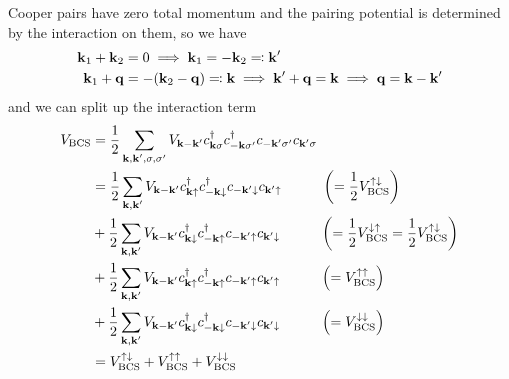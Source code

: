 \documentclass[../main.tex]{subfiles}
\begin{document}
Cooper pairs have zero total momentum and the pairing potential is determined by the interaction on them, so we have
\begin{align}
    \bm{\mathrm{k}}_1 + \bm{\mathrm{k}}_2 &= 0 \implies \bm{\mathrm{k}}_1 = - \bm{\mathrm{k}}_2 \eqcolon \bm{\mathrm{k}}^{\prime} \\
    \bm{\mathrm{k}}_1 + \bm{\mathrm{q}} &= -(\bm{\mathrm{k}}_2 - \bm{\mathrm{q}}) \eqcolon \bm{\mathrm{k}} \implies \bm{\mathrm{k}}^{\prime} + \bm{\mathrm{q}} = \bm{\mathrm{k}} \implies \bm{\mathrm{q}} = \bm{\mathrm{k}} - \bm{\mathrm{k}}^{\prime}
\end{align}
and we can split up the interaction term
\begin{align}
    V_{\text{BCS}} &= \frac{1}{2} \sum_{\bm{\mathrm{k}}, \bm{\mathrm{k}}^{\prime}, \sigma, \sigma^{\prime}} V_{\bm{\mathrm{k}}-\bm{\mathrm{k}}^{\prime}} c_{\bm{\mathrm{k}} \sigma}^{\dagger} c_{-\bm{\mathrm{k}} \sigma^{\prime}}^{\dagger} c_{-\bm{\mathrm{k}}^{\prime} \sigma^{\prime}} c_{\bm{\mathrm{k}}^{\prime} \sigma} \\
    &= \frac{1}{2} \sum_{\bm{\mathrm{k}}, \bm{\mathrm{k}}^{\prime}} V_{\bm{\mathrm{k}}-\bm{\mathrm{k}}^{\prime}} c_{\bm{\mathrm{k}} \uparrow}^{\dagger} c_{-\bm{\mathrm{k}} \downarrow}^{\dagger} c_{-\bm{\mathrm{k}}^{\prime} \downarrow} c_{\bm{\mathrm{k}}^{\prime} \uparrow} \hspace{1cm} \left(= \frac{1}{2} V_{\text{BCS}}^{\uparrow \downarrow}  \right)\\
    &+ \frac{1}{2} \sum_{\bm{\mathrm{k}}, \bm{\mathrm{k}}^{\prime}} V_{\bm{\mathrm{k}}-\bm{\mathrm{k}}^{\prime}} c_{\bm{\mathrm{k}} \downarrow}^{\dagger} c_{-\bm{\mathrm{k}} \uparrow}^{\dagger} c_{-\bm{\mathrm{k}}^{\prime} \uparrow} c_{\bm{\mathrm{k}}^{\prime} \downarrow} \hspace{1cm} \left(= \frac{1}{2} V_{\text{BCS}}^{\downarrow \uparrow} = \frac{1}{2} V_{\text{BCS}}^{\uparrow \downarrow} \right)\\
    &+ \frac{1}{2} \sum_{\bm{\mathrm{k}}, \bm{\mathrm{k}}^{\prime}} V_{\bm{\mathrm{k}}-\bm{\mathrm{k}}^{\prime}} c_{\bm{\mathrm{k}} \uparrow}^{\dagger} c_{-\bm{\mathrm{k}} \uparrow}^{\dagger} c_{-\bm{\mathrm{k}}^{\prime} \uparrow} c_{\bm{\mathrm{k}}^{\prime} \uparrow} \hspace{1cm} \left(= V_{\text{BCS}}^{\uparrow \uparrow} \right)\\
    &+ \frac{1}{2} \sum_{\bm{\mathrm{k}}, \bm{\mathrm{k}}^{\prime}} V_{\bm{\mathrm{k}}-\bm{\mathrm{k}}^{\prime}} c_{\bm{\mathrm{k}} \downarrow}^{\dagger} c_{-\bm{\mathrm{k}} \downarrow}^{\dagger} c_{-\bm{\mathrm{k}}^{\prime} \downarrow} c_{\bm{\mathrm{k}}^{\prime} \downarrow} \hspace{1cm} \left(= V_{\text{BCS}}^{\downarrow \downarrow} \right) \\
    &= V_{\text{BCS}}^{\uparrow \downarrow} + V_{\text{BCS}}^{\uparrow \uparrow} + V_{\text{BCS}}^{\downarrow \downarrow}
\end{align}
\end{document}
